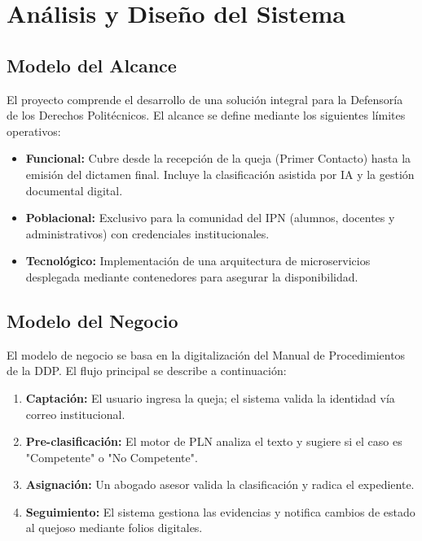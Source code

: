
\chapter{Análisis y Diseño del Sistema}
\label{cap:analisis_diseno}

\section{Modelo del Alcance}
El proyecto comprende el desarrollo de una solución integral para la Defensoría de los Derechos Politécnicos. El alcance se define mediante los siguientes límites operativos:

\begin{itemize}
    \item \textbf{Funcional:} Cubre desde la recepción de la queja (Primer Contacto) hasta la emisión del dictamen final. Incluye la clasificación asistida por IA y la gestión documental digital.
    \item \textbf{Poblacional:} Exclusivo para la comunidad del IPN (alumnos, docentes y administrativos) con credenciales institucionales.
    \item \textbf{Tecnológico:} Implementación de una arquitectura de microservicios desplegada mediante contenedores para asegurar la disponibilidad.
\end{itemize}

\section{Modelo del Negocio}
El modelo de negocio se basa en la digitalización del Manual de Procedimientos de la DDP. El flujo principal se describe a continuación:



\begin{enumerate}
    \item \textbf{Captación:} El usuario ingresa la queja; el sistema valida la identidad vía correo institucional.
    \item \textbf{Pre-clasificación:} El motor de PLN analiza el texto y sugiere si el caso es "Competente" o "No Competente".
    \item \textbf{Asignación:} Un abogado asesor valida la clasificación y radica el expediente.
    \item \textbf{Seguimiento:} El sistema gestiona las evidencias y notifica cambios de estado al quejoso mediante folios digitales.
\end{enumerate}


